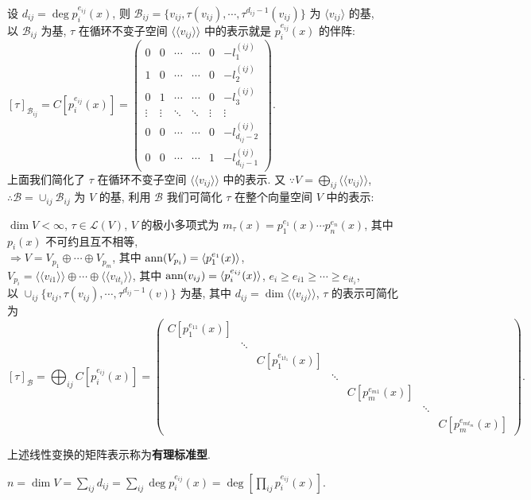 \documentclass{note}
\begin{document}
设 $d_{ij}=\deg p_i^{e_{ij}}(x)$, 则 $\mathcal{B}_{ij}=\{v_{ij},\tau(v_{ij}),\cdots,\tau^{d_{ij}-1}(v_{ij})\}$ 为 $\langle v_{ij}\rangle$ 的基,\\
以 $\mathcal{B}_{ij}$ 为基, $\tau$ 在循环不变子空间 $\langle\langle v_{ij}\rangle\rangle$ 中的表示就是 $p_i^{e_{ij}}(x)$ 的伴阵: $[\tau]_{\mathcal{B}_{ij}}=C[p_i^{e_{ij}}(x)]=\begin{pmatrix}
    0&0&\cdots&\cdots&0&-l_1^{(ij)}\\
    1&0&\cdots&\cdots&0&-l_2^{(ij)}\\
    0&1&\cdots&\cdots&0&-l_3^{(ij)}\\
    \vdots&\vdots&\ddots&\ddots&\vdots&\vdots\\
    0&0&\cdots&\cdots&0&-l_{d_{ij}-2}^{(ij)}\\
    0&0&\cdots&\cdots&1&-l_{d_{ij}-1}^{(ij)}
\end{pmatrix}$.\\

上面我们简化了 $\tau$ 在循环不变子空间 $\langle\langle v_{ij}\rangle\rangle$ 中的表示. 又 $\because V=\bigoplus_{ij}\langle\langle v_{ij}\rangle\rangle$, $\therefore\mathcal{B}=\cup_{ij}\mathcal{B}_{ij}$ 为 $V$ 的基, 利用 $\mathcal{B}$ 我们可简化 $\tau$ 在整个向量空间 $V$ 中的表示:
\begin{thm}[(课本定理 7.10)]\label{thm-7.10}
    $\dim V<\infty$, $\tau\in\mathcal{L}(V)$, $V$ 的极小多项式为 $m_{\tau}(x)=p_1^{e_1}(x)\cdots p_n^{e_n}(x)$, 其中 $p_i(x)$ 不可约且互不相等,\\
    $\Longrightarrow V=V_{p_1}\oplus\cdots\oplus V_{p_m}$, 其中 $\operatorname{ann}(V_{p_i})=\langle p_1^{e_1}(x)\rangle$,\\
    $V_{p_i}=\langle\langle v_{i1}\rangle\rangle\oplus\cdots\oplus\langle\langle v_{it_i}\rangle\rangle$, 其中 $\operatorname{ann}(v_{ij})=\langle p_i^{e_{ij}}(x)\rangle$, $e_i\geq e_{i1}\geq\cdots\geq e_{it_i}$,\\
    以 $\cup_{ij}\{v_{ij},\tau(v_{ij}),\cdots,\tau^{d_{ij}-1}(v)\}$ 为基, 其中 $d_{ij}=\dim\langle\langle v_{ij}\rangle\rangle$, $\tau$ 的表示可简化为
    $$[\tau]_{\mathcal{B}}=\bigoplus_{ij}C[p_i^{e_{ij}}(x)]=\begin{pmatrix}
        C[p_1^{e_{11}}(x)]\\
        &\ddots\\
        &&C[p_1^{e_{1t_1}}(x)]\\
        &&&\ddots\\
        &&&&C[p_m^{e_{m1}}(x)]\\
        &&&&&\ddots\\
        &&&&&&C[p_m^{e_{mt_m}}(x)]
    \end{pmatrix}.$$
\end{thm}

\begin{df}[有理标准型]
    上述线性变换的矩阵表示称为\textbf{有理标准型}.
\end{df}

$n=\dim V=\sum_{ij}d_{ij}=\sum_{ij}\deg p_i^{e_{ij}}(x)=\deg\left[\prod_{ij}p_i^{e_{ij}}(x)\right]$.
\ifx\allfiles\undefined
\end{document}
